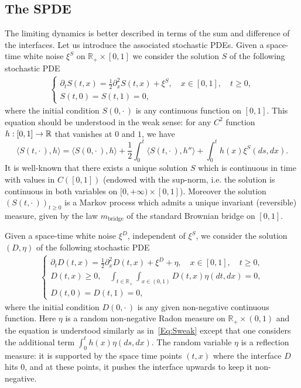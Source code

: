 \documentclass[AHL,Unicode,longabstracts]{cedram}
\theoremstyle{plain}
\newcommand{\R}{\mathbb{R}}
\newcommand{\mBB}{m_{\mathrm{bridge}}}
\renewcommand*{\to}{\mathchoice{\longrightarrow}{\rightarrow}{\rightarrow}{\rightarrow}}
\begin{document}
\subsection{The SPDE}\label{Sec:SPDEPair}

The limiting dynamics is better described in terms of the sum and difference of the interfaces. Let us introduce the associated stochastic PDEs. Given a space-time white noise $\xi^S$ on $\R_+\times[0,1]$ we consider the solution $S$ of the following stochastic PDE
\begin{align*}
\begin{cases}
\partial_t S(t,x) = \frac12 \partial_x^2 S(t,x) + \xi^S,\quad x\in [0,1],\quad t\ge 0,\\
S(t,0)=S(t,1)=0,
\end{cases}
\end{align*}
where the initial condition $S(0,\cdot\,)$ is any continuous function on $[0,1]$. This equation should be understood in the weak sense: for any $C^2$ function $h:[0,1]\to\R$ that vanishes at $0$ and $1$, we have
\begin{equation}\label{Eq:Sweak}
\langle S(t,\cdot\,),h\rangle = \langle S(0,\cdot\,),h\rangle + \frac12\int_0^t \langle S(t,\cdot\,),h''\rangle +\int_0^t h(x) \xi^S(ds,dx).
\end{equation}
It is well-known that there exists a unique solution $S$ which is continuous in time with values in $C([0,1])$ (endowed with the sup-norm, i.e. the solution is continuous in both variables on $[0,+\infty)\times [0,1]$). Moreover the solution $(S(t,\cdot\,))_{t\geq 0}$ is a Markov process which admits a unique invariant (reversible) measure, given by the law $\mBB$ of the standard Brownian bridge on $[0,1]$.

Given a space-time white noise $\xi^D$, independent of $\xi^S$, we consider the solution $(D,\eta)$ of the following stochastic PDE
\begin{align}
\begin{cases}
\partial_t D(t,x) = \frac12 \partial_x^2 D(t,x) + \xi^D + \eta,\quad x\in [0,1],\quad t\ge 0,\\
D(t,x)\ge 0,\quad \int_{t\in\R_+} \int_{x\in (0,1)} D(t,x) \eta(dt,dx) = 0,\\
D(t,0)=D(t,1)=0,
\end{cases}\label{eq:NP}
\end{align}
where the initial condition $D(0,\cdot\,)$ is any given non-negative continuous function. Here $\eta$ is a random non-negative Radon measure on $\R_+\times (0,1)$ and the equation is understood similarly as in~\eqref{Eq:Sweak} except that one considers the additional term $\int_0^t h(x) \eta(ds,dx)$. The random variable $\eta$ is a reflection measure: it is supported by the space time points $(t,x)$ where the interface $D$ hits $0$, and at these points, it pushes the interface upwards to keep it non-negative.
\end{document}
